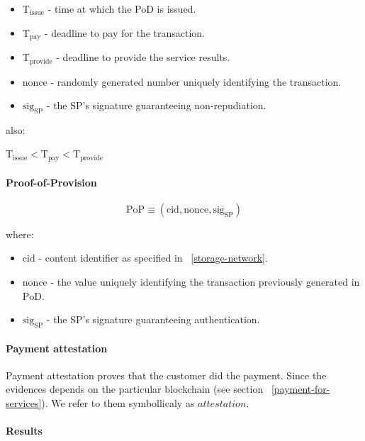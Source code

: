 \documentclass{ieeeaccess}
\begin{document}
\begin{itemize}

\item $\mathrm{T}_\mathrm{issue}$ - time at which the PoD is issued.
\item
  $\mathrm{T}_\mathrm{pay}$ - deadline to pay for the transaction.
\item
  $\mathrm{T}_\mathrm{provide}$ - deadline to provide the service results.
\item $\mathrm{nonce}$ - randomly generated number uniquely identifying the transaction.
\item $\mathrm{sig}_\mathrm{SP}$ - the SP's signature guaranteeing non-repudiation.
\end{itemize}

also:

\(\mathrm{T}_\mathrm{issue} < \mathrm{T}_\mathrm{pay} < \mathrm{T}_\mathrm{provide}\)

\paragraph{Proof-of-Provision}\label{proof-of-provision}

\[\mathrm{PoP} \equiv (\mathrm{cid}, \mathrm{nonce}, \mathrm{sig}_\mathrm{SP})\]

where:

\begin{itemize}

\item
  \(\mathrm{cid}\) - content identifier as specified in ~\ref{storage-network}.
\item
  \(\mathrm{nonce}\) - the value uniquely identifying the transaction previously generated in $\mathrm{PoD}$.
\item
  \(\mathrm{sig}_\mathrm{SP}\) - the SP's signature guaranteeing authentication.
\end{itemize}

\paragraph{Payment attestation}\label{payment-attestation}

Payment attestation proves that the customer did the payment. Since the
evidences depends on the particular blockchain (see section ~\ref{payment-for-services}). We refer to them symbollicaly as
\(attestation\).

\paragraph{Results}\label{results}
\end{document}
